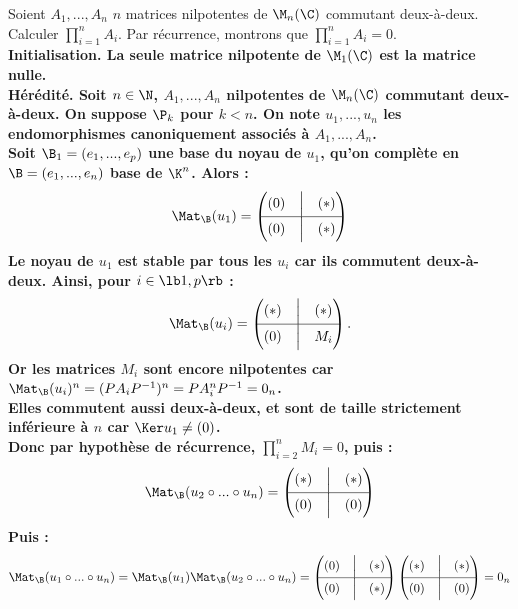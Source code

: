 \documentclass[11pt]{article}
\begin{document}
\begin{exercice}{}{}
    Soient $A_1,...,A_n$ $n$ matrices nilpotentes de $\M_n(\C)$ commutant deux-à-deux. Calculer $\prod_{i=1}^n A_i$.
    \tcblower
    Par récurrence, montrons que $\prod_{i=1}^nA_i = 0$.\\
    \bf{Initialisation.} La seule matrice nilpotente de $\M_1(\C)$ est la matrice nulle.\\
    \bf{Hérédité.} Soit $n\in\N$, $A_1,...,A_n$ nilpotentes de $\M_n(\C)$ commutant deux-à-deux. On suppose $\P_k$ pour $k<n$.
    On note $u_1,...,u_n$ les endomorphismes canoniquement associés à $A_1,...,A_n$.\\
    Soit $\B_1=(e_1,...,e_p)$ une base du noyau de $u_1$, qu'on complète en $\B=(e_1,...,e_n)$ base de $\K^n$. Alors :
    \begin{equation*}
        \Mat_\B(u_1)=\begin{pmatrix}(0) & \Big| & (*) \\ \hline (0) & \Big| & (*)\end{pmatrix}
    \end{equation*}
    Le noyau de $u_1$ est stable par tous les $u_i$ car ils commutent deux-à-deux. Ainsi, pour $i\in\lb1,p\rb$ :
    \begin{equation*}
        \Mat_\B(u_i) = \begin{pmatrix}(*) & \Big| & (*) \\ \hline (0) & \Big| & M_i\end{pmatrix}.
    \end{equation*}
    Or les matrices $M_i$ sont encore nilpotentes car $\Mat_\B(u_i)^n = (PA_iP^{-1})^n = PA_i^nP^{-1} = 0_n$.\\
    Elles commutent aussi deux-à-deux, et sont de taille strictement inférieure à $n$ car $\Ker u_1 \neq (0)$.\\
    Donc par hypothèse de récurrence, $\prod_{i=2}^n M_i=0$,  puis :
    \begin{equation*}
        \Mat_\B(u_2\circ...\circ u_n) = \begin{pmatrix}(*) & \Big| & (*) \\ \hline (0) & \Big| & (0)\end{pmatrix}
    \end{equation*}
    Puis :
    \begin{equation*}
        \Mat_\B(u_1\circ ... \circ u_n) = \Mat_{\B}(u_1)\Mat_\B(u_2\circ...\circ u_n) = \begin{pmatrix}(0) & \Big| & (*) \\ \hline (0) & \Big| & (*)\end{pmatrix}\begin{pmatrix}(*) & \Big| & (*) \\ \hline (0) & \Big| & (0)\end{pmatrix}=0_n
    \end{equation*}
\end{exercice}    
\end{document}
